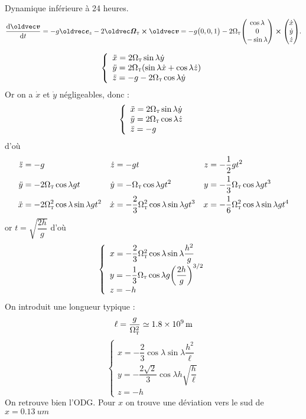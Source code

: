 \begin{solution}
\begin{questions}
    \questioncours Dynamique inférieure à 24 heures.
    \question 
    $$\dv{\vv}{t} = -g\vec{e}_z - 2\vec{\Omega}_\textsc{t}\cross\vv = -g\mqty(0,0,1) - 2\Omega_\textsc{t} \mqty(\cos\lambda\\0\\-\sin\lambda)\cross\mqty(\dot{x}\\\dot{y}\\\dot{z}).$$

    $$\left\lbrace\begin{array}{l}
        \ddot{x} = 2\Omega_\textsc{t} \sin\lambda \dot{y}  \\
        \ddot{y} = 2\Omega_\textsc{t} (\sin\lambda \dot{x} + \cos\lambda \dot{z})  \\
        \ddot{z} = -g - 2\Omega_\textsc{t} \cos\lambda \dot{y}
    \end{array}\right.$$
    \question Or on a $\dot{x}$ et $\dot{y}$ négligeables, donc :
    $$\left\lbrace\begin{array}{l}
        \ddot{x} = 2\Omega_\textsc{t} \sin\lambda \dot{y}  \\
        \ddot{y} = 2\Omega_\textsc{t} \cos\lambda \dot{z}  \\
        \ddot{z} = -g
    \end{array}\right.$$
    d'où
    \begin{align*}
        \ddot{z} &= -g &
        \dot{z} &= -gt &
        z &= -\dfrac{1}{2}gt^2 \\
        \ddot{y} &= -2\Omega_\textsc{t} \cos\lambda g t &
        \dot{y} &= -\Omega_\textsc{t} \cos\lambda g t^2 &
        y &= - \dfrac{1}{3}\Omega_\textsc{t} \cos\lambda g t^3 \\
        \ddot{x} &= -2\Omega_\textsc{t}^2 \cos\lambda \sin\lambda g t^2 &
        \dot{x} &= -\dfrac{2}{3}\Omega_\textsc{t}^2 \cos\lambda \sin\lambda g t^3 &
        x &= -\dfrac{1}{6}\Omega_\textsc{t}^2 \cos\lambda \sin\lambda g t^4
    \end{align*}
    or $t = \sqrt{\dfrac{2h}{g}}$ d'où
    $$\left\lbrace\begin{array}{l}
        x =  -\dfrac{2}{3}\Omega_\textsc{t}^2 \cos\lambda \sin\lambda \dfrac{h^2}{g} \\
        y = - \dfrac{1}{3}\Omega_\textsc{t} \cos\lambda g \qty(\dfrac{2h}{g})^{3/2} \\
        z = - h
    \end{array}\right.$$
    \question On introduit une longueur typique :
    $$\ell = \dfrac{g}{\Omega_\textsc{t}^2} \simeq \SI{1,8e9}{m}$$
    $$\left\lbrace\begin{array}{l}
        x =  -\dfrac{2}{3} \cos\lambda \sin\lambda \dfrac{h^2}{\ell} \\
        y = - \dfrac{2\sqrt{2}}{3} \cos\lambda h \sqrt{\dfrac{h}{\ell}} \\
        z = - h
    \end{array}\right.$$
    On retrouve bien l'ODG.
    \question Pour $x$ on trouve une déviation vers le sud de $x = \SI{0,13}{um}$
\end{questions}
\end{solution}